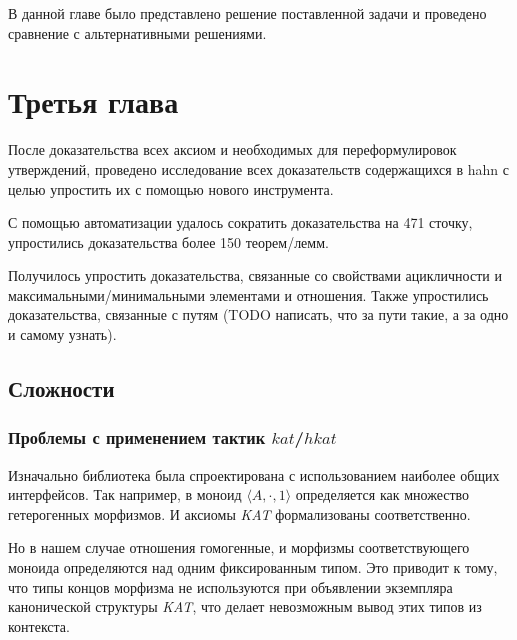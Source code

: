 \documentclass[times
              ]{itmo-student-thesis}
\begin{document}
  \chapterconclusion %
    В данной главе было представлено решение поставленной задачи и проведено сравнение с альтернативными решениями.

\chapter{Третья глава}

  После доказательства всех аксиом и необходимых для переформулировок утверждений,
  проведено исследование всех доказательств содержащихся в hahn с целью упростить их с помощью нового инструмента.

  С помощью автоматизации удалось сократить доказательства на 471 сточку, упростились доказательства более 150 теорем/лемм.

  Получилось упростить доказательства, связанные со свойствами ацикличности и максимальными/минимальными элементами и отношения.
  Также упростились доказательства, связанные с путям (TODO написать, что за пути такие, а за одно и самому узнать).

  \section{Сложности}
    \subsection{Проблемы с применением тактик $kat$/$hkat$}
      Изначально библиотека была спроектирована с использованием наиболее общих интерфейсов.
      Так например, в моноид $ \langle A, \cdot, 1 \rangle $ определяется как множество гетерогенных морфизмов. И аксиомы \textit{KAT} формализованы соответственно.


      Но в нашем случае отношения гомогенные, и морфизмы соответствующего моноида определяются над одним фиксированным типом.
      Это приводит к тому, что типы концов морфизма не используются при объявлении экземпляра канонической структуры \textit{KAT},
      что делает невозможным вывод этих типов из контекста.
\end{document}
